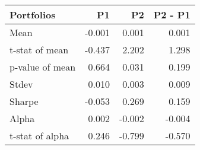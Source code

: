 \begin{tabular}{lrrr}
\toprule
Portfolios & P1 & P2 & P2 - P1 \\
\midrule
Mean & -0.001 & 0.001 & 0.001 \\
t-stat of mean & -0.437 & 2.202 & 1.298 \\
p-value of mean & 0.664 & 0.031 & 0.199 \\
Stdev & 0.010 & 0.003 & 0.009 \\
Sharpe & -0.053 & 0.269 & 0.159 \\
Alpha & 0.002 & -0.002 & -0.004 \\
t-stat of alpha & 0.246 & -0.799 & -0.570 \\
\bottomrule
\end{tabular}
